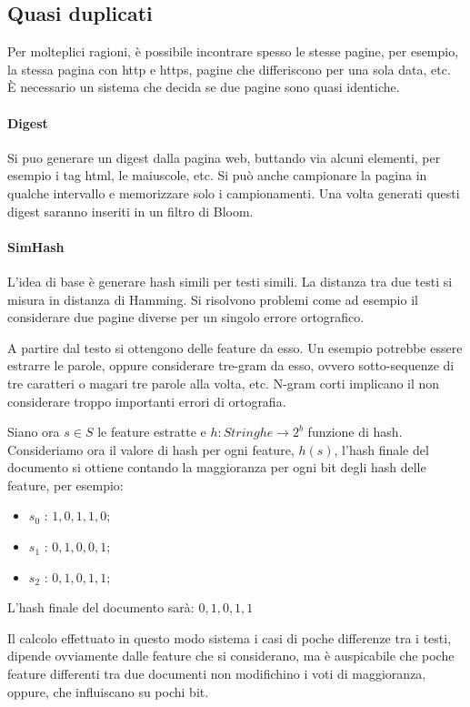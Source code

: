 \subsection{Quasi duplicati}
Per molteplici ragioni, è possibile incontrare spesso le stesse pagine, 
per esempio, la stessa pagina con http e https, pagine che differiscono per una 
sola data, etc.\\
È necessario un sistema che decida se due pagine sono quasi identiche.

\paragraph{Digest}
Si puo generare un digest dalla pagina web, buttando via alcuni elementi, 
per esempio i tag html, le maiuscole, etc.
Si può anche campionare la pagina in qualche intervallo e memorizzare solo 
i campionamenti.
Una volta generati questi digest saranno inseriti in un filtro di Bloom.

\paragraph{SimHash}
L'idea di base è generare hash simili per testi simili. La distanza tra due testi 
si misura in distanza di Hamming.
Si risolvono problemi come ad esempio il considerare due pagine diverse per un 
singolo errore ortografico.

A partire dal testo si ottengono delle feature da esso. Un esempio potrebbe essere 
estrarre le parole, oppure considerare tre-gram da esso, ovvero sotto-sequenze di tre 
caratteri o magari tre parole alla volta, etc.
N-gram corti implicano il non considerare troppo importanti errori di ortografia.

Siano ora $s \in S$ le feature estratte e $h : \mathit{Stringhe} \rightarrow 2^b$ funzione 
di hash.
Consideriamo ora il valore di hash per ogni feature, $h(s)$, l'hash finale del documento 
si ottiene contando la maggioranza per ogni bit degli hash delle feature, per esempio: 
\begin{itemize}
    \item $s_0$ : $1,0,1,1,0$;
    \item $s_1$ : $0,1,0,0,1$;
    \item $s_2$ : $0,1,0,1,1$;
\end{itemize}
L'hash finale del documento sarà: $0, 1, 0, 1, 1$

Il calcolo effettuato in questo modo sistema i casi di poche differenze tra i testi, 
dipende ovviamente dalle feature che si considerano, ma è auspicabile che poche 
feature differenti tra due documenti non modifichino i voti di maggioranza, oppure, che influiscano su pochi bit. 

